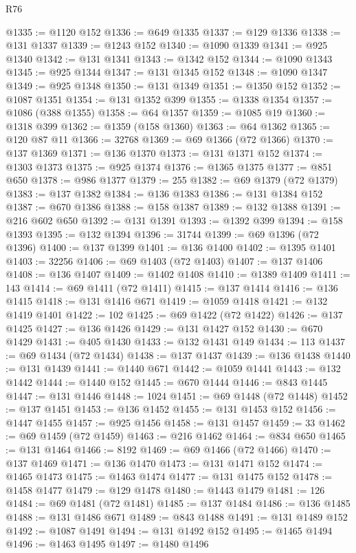 \begin{lexlean}{R76}
\begin{coremodule}
@1335 := @1120 @152
@1336 := @649 @1335
@1337 := @129 @1336
@1338 := @131 @1337
@1339 := @1243 @152
@1340 := @1090 @1339
@1341 := @925 @1340
@1342 := @131 @1341
@1343 := @1342 @152
@1344 := @1090 @1343
@1345 := @925 @1344
@1347 := @131 @1345 @152
@1348 := @1090 @1347
@1349 := @925 @1348
@1350 := @131 @1349
@1351 := @1350 @152
@1352 := @1087 @1351
@1354 := @131 @1352 @399
@1355 := @1338 @1354
@1357 := @1086 (@388 @1355)
@1358 := @64 @1357
@1359 := @1085 @19
@1360 := @1318 @399
@1362 := @1359 (@158 @1360)
@1363 := @64 @1362
@1365 := @120 @87 @11
@1366 := 32768
@1369 := @69 @1366 (@72 @1366)
@1370 := @137 @1369
@1371 := @136 @1370
@1373 := @131 @1371 @152
@1374 := @1303 @1373
@1375 := @925 @1374
@1376 := @1365 @1375
@1377 := @851 @650
@1378 := @986 @1377
@1379 := 255
@1382 := @69 @1379 (@72 @1379)
@1383 := @137 @1382
@1384 := @136 @1383
@1386 := @131 @1384 @152
@1387 := @670 @1386
@1388 := @158 @1387
@1389 := @132 @1388
@1391 := @216 @602 @650
@1392 := @131 @1391
@1393 := @1392 @399
@1394 := @158 @1393
@1395 := @132 @1394
@1396 := 31744
@1399 := @69 @1396 (@72 @1396)
@1400 := @137 @1399
@1401 := @136 @1400
@1402 := @1395 @1401
@1403 := 32256
@1406 := @69 @1403 (@72 @1403)
@1407 := @137 @1406
@1408 := @136 @1407
@1409 := @1402 @1408
@1410 := @1389 @1409
@1411 := 143
@1414 := @69 @1411 (@72 @1411)
@1415 := @137 @1414
@1416 := @136 @1415
@1418 := @131 @1416 @671
@1419 := @1059 @1418
@1421 := @132 @1419 @1401
@1422 := 102
@1425 := @69 @1422 (@72 @1422)
@1426 := @137 @1425
@1427 := @136 @1426
@1429 := @131 @1427 @152
@1430 := @670 @1429
@1431 := @405 @1430
@1433 := @132 @1431 @149
@1434 := 113
@1437 := @69 @1434 (@72 @1434)
@1438 := @137 @1437
@1439 := @136 @1438
@1440 := @131 @1439
@1441 := @1440 @671
@1442 := @1059 @1441
@1443 := @132 @1442
@1444 := @1440 @152
@1445 := @670 @1444
@1446 := @843 @1445
@1447 := @131 @1446
@1448 := 1024
@1451 := @69 @1448 (@72 @1448)
@1452 := @137 @1451
@1453 := @136 @1452
@1455 := @131 @1453 @152
@1456 := @1447 @1455
@1457 := @925 @1456
@1458 := @131 @1457
@1459 := 33
@1462 := @69 @1459 (@72 @1459)
@1463 := @216 @1462
@1464 := @834 @650
@1465 := @131 @1464
@1466 := 8192
@1469 := @69 @1466 (@72 @1466)
@1470 := @137 @1469
@1471 := @136 @1470
@1473 := @131 @1471 @152
@1474 := @1465 @1473
@1475 := @1463 @1474
@1477 := @131 @1475 @152
@1478 := @1458 @1477
@1479 := @129 @1478
@1480 := @1443 @1479
@1481 := 126
@1484 := @69 @1481 (@72 @1481)
@1485 := @137 @1484
@1486 := @136 @1485
@1488 := @131 @1486 @671
@1489 := @843 @1488
@1491 := @131 @1489 @152
@1492 := @1087 @1491
@1494 := @131 @1492 @152
@1495 := @1465 @1494
@1496 := @1463 @1495
@1497 := @1480 @1496

\end{coremodule}
\end{lexlean}
